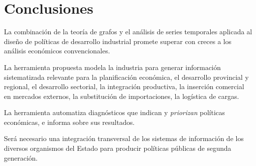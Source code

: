 \documentclass[a4paper]{report}
\begin{document}
\section*{Conclusiones}


La combinación de la teoría de grafos y el análisis de series temporales aplicada al diseño de políticas de desarrollo industrial promete superar con creces a los análisis económicos convencionales.

La herramienta propuesta modela la industria para generar información sistematizada relevante para la planificación económica, el desarrollo provincial y regional, el desarrollo sectorial, la integración productiva, la inserción comercial en mercados externos, la substitución de importaciones, la logística de cargas.

La herramienta automatiza diagnósticos que indican y \textit{priorizan} políticas económicas, e informa sobre sus resultados.

Será necesario una integración transversal de los sistemas de información de los diversos organismos del Estado para producir políticas públicas de segunda generación.
\end{document}
